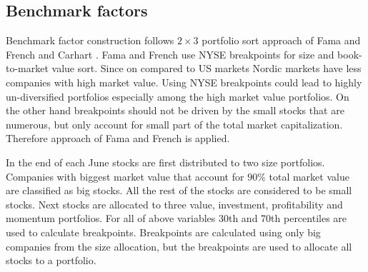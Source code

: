 \documentclass{article}
\begin{document}
\subsection{Benchmark factors}\label{BenchmarkFactors}

Benchmark factor construction follows $2 \times 3$ portfolio sort approach of Fama and French \citeyear{FAMA19933, FAMA20151} and Carhart \citeyear{Carhart1997}. Fama and French \citeyear{FAMA19933} use NYSE breakpoints for size and book-to-market value sort. Since on compared to US markets Nordic markets have less companies with high market value. Using NYSE breakpoints could lead to highly un-diversified portfolios especially among the high market value portfolios. On the other hand breakpoints should not be driven by the small stocks that are numerous, but only account for small part of the total market capitalization. Therefore approach of Fama and French \citeyear{FAMA2012457} is applied.  \par

In the end of each June stocks are first distributed to two size portfolios. Companies with biggest market value that account for $90\%$ total market value are classified as big stocks. All the rest of the stocks are considered to be small stocks. Next stocks are allocated to three value, investment, profitability and momentum portfolios. For all of above variables 30th and 70th percentiles are used to calculate breakpoints. Breakpoints are calculated using only big companies from the size allocation, but the breakpoints are used to allocate all stocks to a portfolio. \par
\end{document}
